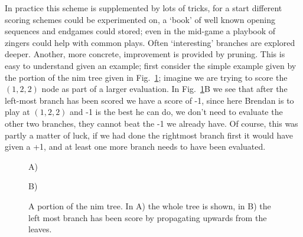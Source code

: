 \documentclass[11pt,a4paper]{scrartcl}
\begin{document}
In practice this scheme is supplemented by lots of tricks, for a start
different scoring schemes could be experimented on, a \lq{}book\rq{}
of well known opening sequences and endgames could stored; even in the
mid-game a playbook of zingers could help with common plays. Often
\lq{}interesting\rq{} branches are explored deeper. Another, more concrete,
improvement is provided by pruning. This is easy to understand given
an example; first consider the simple example given by the portion of
the nim tree given in Fig.~\ref{fig:nim-alpha-beta}; imagine we are
trying to score the $(1,2,2)$ node as part of a larger evaluation. In
Fig.~\ref{fig:nim-alpha-beta}B we see that after the left-most branch
has been scored we have a score of -1, since here Brendan is to play
at $(1,2,2)$ and -1 is the best he can do, we don't need to evaluate
the other two branches, they cannot beat the -1 we already have. Of
course, this was partly a matter of luck, if we had done the rightmost
branch first it would have given a +1, and at least one more branch
needs to have been evaluated.

\begin{figure}
A)
\begin{center}
\end{center}
B)
\begin{center}
\end{center}
\caption{A portion of the nim tree. In A) the whole tree is shown, in
  B) the left most branch has been score by propagating upwards from
  the leaves.\label{fig:nim-alpha-beta}}
\end{figure}
\end{document}
